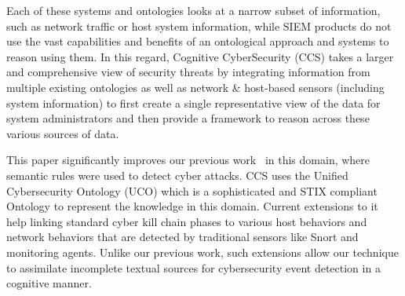 Each of these systems and ontologies looks at a narrow subset of information, such as network traffic or host system information, while SIEM products do not use the vast capabilities and benefits of an ontological approach and systems to reason using them.  In this regard, Cognitive CyberSecurity (CCS) takes a larger and comprehensive view of security threats by integrating information from multiple existing ontologies as well as network \& host-based sensors (including system information) to first create a single representative view of the data for system administrators and then provide a framework to reason across these various sources of data.

This paper significantly improves our previous work~\cite{more2012knowledge} in this domain, where semantic rules were used to detect cyber attacks. CCS uses the Unified Cybersecurity Ontology (UCO) which is a sophisticated and STIX compliant  Ontology to represent the knowledge in this domain. Current extensions to it help linking standard cyber kill chain phases to various host behaviors and network behaviors that are detected by traditional sensors like Snort and monitoring agents. Unlike our previous work, such extensions allow our technique to assimilate incomplete textual sources  for cybersecurity event detection in a cognitive manner. 